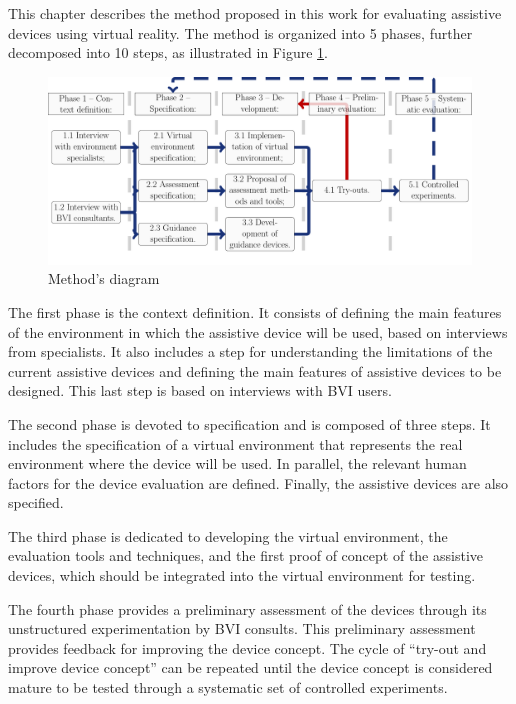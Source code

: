 This chapter describes the method proposed in this work for evaluating assistive devices using virtual reality. The method is organized into 5 phases, further decomposed into 10 steps, as illustrated in Figure \ref{fig:diag_metodologia}.


%
\begin{figure}[H]
    \includegraphics[width = \linewidth]{Metodologia/metodologia.pdf}
    \caption{Method's diagram}
    \label{fig:diag_metodologia}
\end{figure}

The first phase is the context definition. It consists of defining the main features of the environment in which the assistive device will be used, based on interviews from specialists. It also includes a step for understanding the limitations of the current assistive devices and defining the main features of assistive devices to be designed. This last step is based on interviews with BVI users.

The second phase is devoted to specification and is composed of three steps. It includes the specification of a virtual environment that represents the real environment where the device will be used. In parallel, the relevant human factors for the device evaluation are defined. Finally, the assistive devices are also specified.

The third phase is dedicated to developing the virtual environment, the evaluation tools and techniques, and the first proof of concept of the assistive devices, which should be integrated into the virtual environment for testing. 

The fourth phase provides a preliminary assessment of the devices through its unstructured experimentation by BVI consults. This preliminary assessment provides feedback for improving the device concept. The cycle of “try-out and improve device concept” can be repeated until the device concept is considered mature to be tested through a systematic set of controlled experiments.

